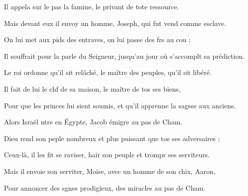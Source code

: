 \item Il appela sur le pas la famine,\psstar{} le privant de tote ressource.
\item Mais devant eux il envoy un homme,\psstar{} Joseph, qui fut vend comme esclave.
\item On lui met aux pids des entraves,\psstar{} on lui passe des frs au cou ;
\item Il souffrait pour la parle du Seigneur,\psstar{} jusqu’au jour où s’accomplt sa prédiction.
\item Le roi ordonne qu’il sit relâché,\psstar{} le maître des peuples, qu’il sit libéré.
\item Il fait de lui le chf de sa maison,\psstar{} le maître de tos ses biens,
\item Pour que les princes lui sient soumis,\psstar{} et qu’il apprenne la sagsse aux anciens.
\item Alors Israël ntre en Égypte,\psstar{} Jacob émigre au pas de Cham.
\item Dieu rend son peple nombreux\psstar{} et plus puissant que tos ses adversaires ;
\item Ceux-là, il les fit se raviser,\psstar{} haïr son peuple et trompr ses serviteurs.
\item Mais il envoie son serviter, Moïse,\psstar{} avec un homme de son chix, Aaron,
\item Pour annoncer des sgnes prodigieux,\psstar{} des miracles au pas de Cham.